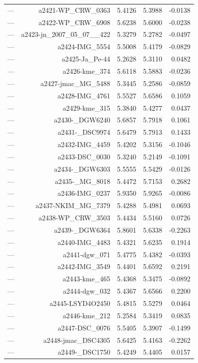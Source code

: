 \begin{table}[htbp]
\begin{tabular}{lrrrr}
— & a2421-WP_CRW_0363 & 5.4126 & 5.3988 & -0.0138 \\
— & a2422-WP_CRW_6908 & 5.6238 & 5.6000 & -0.0238 \\
— & a2423-jn_2007_05_07__422 & 5.3279 & 5.2782 & -0.0497 \\
— & a2424-IMG_5554 & 5.5008 & 5.4179 & -0.0829 \\
— & a2425-Ja_Pe-44 & 5.2628 & 5.3110 & 0.0482 \\
— & a2426-kme_374 & 5.6118 & 5.5883 & -0.0236 \\
— & a2427-jmac_MG_5488 & 5.3445 & 5.2586 & -0.0859 \\
— & a2428-IMG_4761 & 5.5527 & 5.6586 & 0.1059 \\
— & a2429-kme_315 & 5.3840 & 5.4277 & 0.0437 \\
— & a2430-_DGW6240 & 5.6857 & 5.7918 & 0.1061 \\
— & a2431-_DSC9974 & 5.6479 & 5.7913 & 0.1433 \\
— & a2432-IMG_4459 & 5.4202 & 5.3156 & -0.1046 \\
— & a2433-DSC_0030 & 5.3240 & 5.2149 & -0.1091 \\
— & a2434-_DGW6303 & 5.5555 & 5.5429 & -0.0126 \\
— & a2435-_MG_8018 & 5.4472 & 5.7153 & 0.2682 \\
— & a2436-IMG_0237 & 5.9350 & 5.9265 & -0.0086 \\
— & a2437-NKIM_MG_7379 & 5.4288 & 5.4981 & 0.0693 \\
— & a2438-WP_CRW_3503 & 5.4434 & 5.5160 & 0.0726 \\
— & a2439-_DGW6364 & 5.8601 & 5.6338 & -0.2263 \\
— & a2440-IMG_4483 & 5.4321 & 5.6235 & 0.1914 \\
— & a2441-dgw_071 & 5.4775 & 5.4382 & -0.0393 \\
— & a2442-IMG_3549 & 5.4401 & 5.6592 & 0.2191 \\
— & a2443-kme_465 & 5.4368 & 5.3475 & -0.0892 \\
— & a2444-dgw_032 & 5.4367 & 5.6566 & 0.2200 \\
— & a2445-LSYD4O2450 & 5.4815 & 5.5279 & 0.0464 \\
— & a2446-kme_212 & 5.2584 & 5.3419 & 0.0835 \\
— & a2447-DSC_0076 & 5.5405 & 5.3907 & -0.1499 \\
— & a2448-jmac_DSC4305 & 5.6425 & 5.4163 & -0.2262 \\
— & a2449-_DSC1750 & 5.4249 & 5.4405 & 0.0157 \\

\end{tabular}
\end{table}
